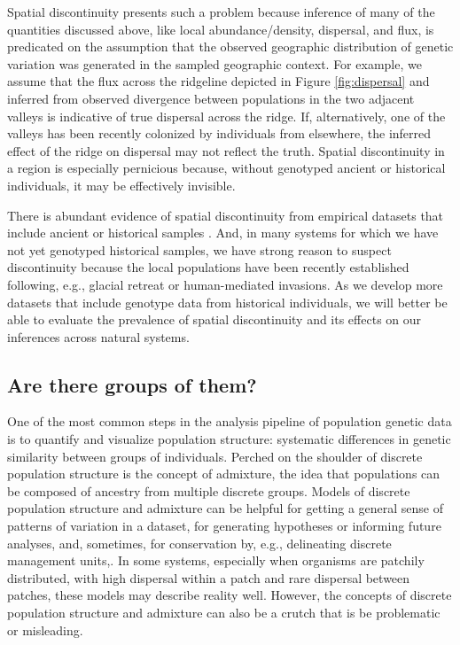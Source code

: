 \documentclass{ar-1col}
\newcommand{\todo}[1]{{\textbf{\color{red}{#1}}}}
\begin{document}
Spatial discontinuity presents such a problem because 
inference of many of the quantities discussed above, 
like local abundance/density, dispersal, and flux, 
is predicated on the assumption that 
the observed geographic distribution of genetic variation 
was generated in the sampled geographic context.
For example, 
we assume that the flux across the ridgeline 
depicted in Figure \ref{fig:dispersal}
and inferred from observed divergence 
between populations in the two adjacent valleys 
is indicative of true dispersal across the ridge.
If, alternatively, one of the valleys 
has been recently colonized by individuals from elsewhere, 
the inferred effect of the ridge on dispersal may not reflect the truth.
Spatial discontinuity in a region is especially pernicious because, 
without genotyped ancient or historical individuals, 
it may be effectively invisible.

There is abundant evidence of spatial discontinuity 
from empirical datasets that include ancient or historical samples 
\citep{bi2013unlocking, PickrellReich2014, lazaridis_ancient_2014, haak2015massive, allentoft2015population, joseph2018inference}.
And, in many systems for which we have not yet genotyped historical samples, 
we have strong reason to suspect discontinuity 
because the local populations have been recently established 
following, e.g., glacial retreat or human-mediated invasions.
As we develop more datasets that include genotype data from historical individuals, 
we will better be able to evaluate the prevalence of spatial discontinuity 
and its effects on our inferences across natural systems. 

\todo{read through and edit}


\subsection{Are there groups of them?}
One of the most common steps in the analysis pipeline of population genetic data
is to quantify and visualize population structure:
systematic differences in genetic similarity between groups of individuals.
Perched on the shoulder of discrete population structure is the concept of admixture,
the idea that populations can be composed of ancestry from multiple discrete groups.
Models of discrete population structure and admixture 
can be helpful for getting a general sense of patterns of variation in a dataset, 
for generating hypotheses or informing future analyses, 
and, sometimes, for conservation by, 
e.g., delineating discrete management units,.
In some systems, 
especially when organisms are patchily distributed, 
with high dispersal within a patch and rare dispersal between patches,
these models may describe reality well.
However, 
the concepts of discrete population structure and admixture 
can also be a crutch that is be problematic or misleading.
\end{document}
